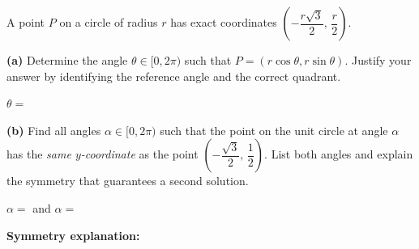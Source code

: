 \documentclass[10pt]{article}
\begin{document}
\vspace{0.1in}

\begin{tcolorbox}[colback=white, colframe=black!40,
    title=\textbf{Tier E --- Symmetry and Inverse Reasoning},
    fonttitle=\bfseries, arc=2mm, left=3mm, right=3mm, top=2mm, bottom=2mm]
\small
A point $P$ on a circle of radius $r$ has exact coordinates $\left(-\dfrac{r\sqrt{3}}{2},\, \dfrac{r}{2}\right)$.

\vspace{0.08in}
\textbf{(a)} Determine the angle $\theta \in [0, 2\pi)$ such that $P = (r\cos\theta, r\sin\theta)$.
Justify your answer by identifying the reference angle and the correct quadrant.

\vspace{0.9in}

$\theta = $ \underline{\hspace{2.2cm}}

\vspace{0.1in}
\textbf{(b)} Find all angles $\alpha \in [0, 2\pi)$ such that the point on the unit circle at angle $\alpha$
has the \emph{same $y$-coordinate} as the point $\left(-\dfrac{\sqrt{3}}{2},\, \dfrac{1}{2}\right)$.
List both angles and explain the symmetry that guarantees a second solution.

\vspace{0.9in}

$\alpha = $ \underline{\hspace{2.2cm}} and $\alpha = $ \underline{\hspace{2.2cm}}

\vspace{0.1in}
\textbf{Symmetry explanation:}

\vspace{0.5in}
\end{tcolorbox}
\end{document}

